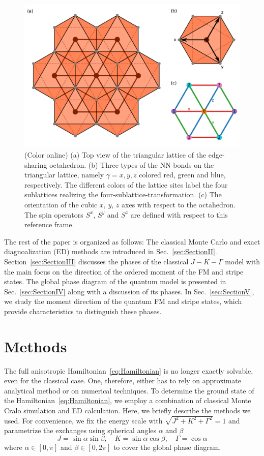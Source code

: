 \documentclass[aps,prb,reprint,amsfonts,amsmath,amssymb,showpacs,groupedaddress,superscriptaddress]{revtex4-1}
\begin{document}
\begin{figure}
    \includegraphics[width=\columnwidth]{Fig1.pdf}
    \caption{\label{fig:ModelDefinition}(Color online) (a) Top view of the triangular lattice of the edge-sharing octahedron. (b) Three types of the NN bonds on the triangular lattice, namely $\gamma=x, y, z$ colored red, green and blue, respectively. The different colors of the lattice sites label the four sublattices realizing the four-sublattice-transformation. (c) The orientation of the cubic $x$, $y$, $z$ axes with respect to the octahedron. The spin operators $S^x$, $S^y$ and $S^z$ are defined with respect to this reference frame.}
\end{figure}

The rest of the paper is organized as follows: The classical Monte Carlo and exact diagnoalization (ED) methods are introduced in Sec.~\ref{sec:SectionII}. Section~\ref{sec:SectionIII} discusses the phases of the classical $J-K-\Gamma$ model with the main focus on the direction of the ordered moment of the FM and stripe states. The global phase diagram of the quantum model is presented in Sec.~\ref{sec:SectionIV} along with a discussion of its phases. In Sec.~\ref{sec:SectionV}, we study the moment direction of the quantum FM and stripe states, which provide characteristics to distinguish these phases.

\section{\label{sec:SectionII}Methods}
The full anisotropic Hamiltonian~\eqref{eq:Hamiltonian} is no longer exactly solvable, even for the classical case. One, therefore, either has to rely on approximate analytical method or on numerical techniques. To determine the ground state of the Hamiltonian~\eqref{eq:Hamiltonian}, we employ a combination of classical Monte Cralo simulation and ED calculation. Here, we briefly describe the methods we used. For convenience, we fix the energy scale with $\sqrt{J^2 + K^2 + \Gamma^2}=1$ and parametrize the exchanges using spherical angles $\alpha$ and $\beta$
\begin{equation}
    J = \sin\alpha \sin\beta, \quad
    K = \sin\alpha \cos\beta, \quad
    \Gamma = \cos\alpha \label{eq:Parameters}
\end{equation}
where $\alpha \in [0, \pi]$ and $\beta \in [0, 2\pi]$ to cover the global phase diagram.
\end{document}
